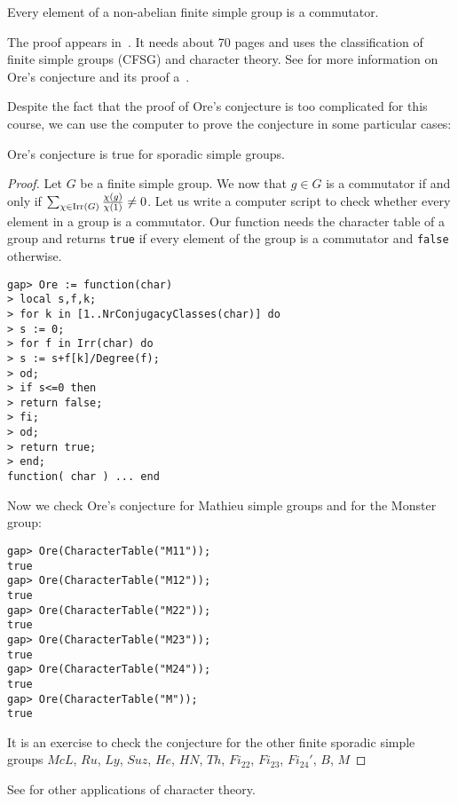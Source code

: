 \begin{theorem}
    Every element of a non-abelian finite simple group is a commutator.     
\end{theorem}

The proof appears in~\cite{MR2654085}. It needs about 70 pages and
uses the classification of finite simple groups (CFSG) and character theory.
See \cite{MR3289286} for more information on Ore's conjecture and its proof 
a~\cite{MR3289286}. 

Despite the fact that the proof of Ore's conjecture is too complicated for 
this course, we can use the computer to 
prove the conjecture in some particular cases:

\begin{proposition}
    Ore's conjecture is true 
    for sporadic simple groups.
\end{proposition}

\begin{proof}
    Let $G$ be a finite simple group. 
    We now that $g\in G$ is a commutator if and only if 
    $\sum_{\chi\in\operatorname{Irr}(G)}\frac{\chi(g)}{\chi(1)}\ne 0$. Let us write
    a computer script to check whether every element in a group 
    is a commutator. Our
    function needs the character table of a group and returns 
    \lstinline{true} if every element of the group is a commutator and
    \lstinline{false} otherwise. 
\begin{lstlisting}
gap> Ore := function(char) 
> local s,f,k;
> for k in [1..NrConjugacyClasses(char)] do
> s := 0;
> for f in Irr(char) do
> s := s+f[k]/Degree(f);  
> od;
> if s<=0 then
> return false;
> fi;
> od;
> return true;
> end;
function( char ) ... end
\end{lstlisting}
Now we check Ore's conjecture for Mathieu simple groups
and for the Monster group: 
\begin{lstlisting}
gap> Ore(CharacterTable("M11"));
true
gap> Ore(CharacterTable("M12"));
true
gap> Ore(CharacterTable("M22"));
true
gap> Ore(CharacterTable("M23"));
true
gap> Ore(CharacterTable("M24"));
true
gap> Ore(CharacterTable("M"));
true
\end{lstlisting}
It is an exercise to check the conjecture for the other finite sporadic 
simple groups $McL$, $Ru$, $Ly$, $Suz$, $He$, $HN$, $Th$, $Fi_{22}$, $Fi_{23}$, $Fi_{24}'$, $B$, $M$ 
\end{proof}

See \cite{MR3821142} for other applications of character theory. 
